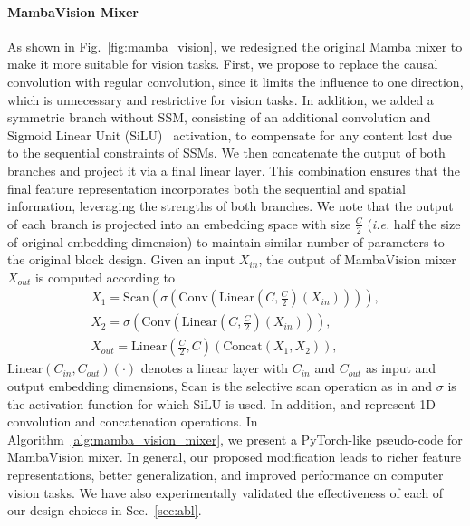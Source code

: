 \documentclass[10pt,twocolumn,letterpaper]{article}
\begin{document}
\paragraph{MambaVision Mixer} As shown in Fig.~\ref{fig:mamba_vision}, we redesigned the original Mamba mixer to make it more suitable for vision tasks. First, we propose to replace the causal convolution with regular convolution, since it limits the influence to one direction, which is unnecessary and restrictive for vision tasks. In addition, we added a symmetric branch without SSM, consisting of an additional convolution and Sigmoid Linear Unit (SiLU)~\cite{elfwing2018sigmoid} activation, to compensate for any content lost due to the sequential constraints of SSMs. We then concatenate the output of both branches and project it via a final linear layer. This combination ensures that the final feature representation incorporates both the sequential and spatial information, leveraging the strengths of both branches. We note that the output of each branch is projected into an embedding space with size $\frac{C}{2}$ (\textit{i.e.} half the size of original embedding dimension) to maintain similar number of parameters to the original block design. Given an input $X_{in}$, the output of MambaVision mixer $X_{out}$ is computed according to
\begin{equation}
\begin{array}{l}
{X_{1}}=\text{Scan}(\sigma(\text{Conv}(\text{Linear}(C, \frac{C}{2})({X_{in}})))), \\
{X_{2}}=\sigma(\text{Conv}(\text{Linear}(C, \frac{C}{2})({X_{in}}))), \\
{X_{out}}=\text{Linear}(\frac{C}{2},C)(\text{Concat}(X_{1}, X_{2})),
\end{array}
\label{eq:eq_mixer1}
\end{equation}
$\text{Linear}(C_{in}, C_{out})(\cdot)$ denotes a linear layer with $C_{in}$ and $C_{out}$ as input and output embedding dimensions, $\text{Scan}$ is the selective scan operation as in \cite{gu2023mamba} and $\sigma$ is the activation function for which SiLU is used. In addition,  and  represent 1D convolution and concatenation operations. In Algorithm~\ref{alg:mamba_vision_mixer}, we present a PyTorch-like pseudo-code for MambaVision mixer. In general, our proposed modification leads to richer feature representations, better generalization, and improved performance on computer vision tasks. We have also experimentally validated the effectiveness of each of our design choices in Sec.~\ref{sec:abl}.   
\end{document}
